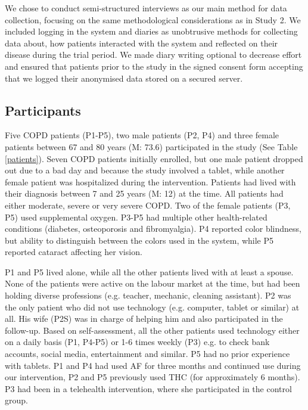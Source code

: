 We chose to conduct semi-structured interviews as our main method for data collection, focusing on the same methodological considerations as in Study 2. We included logging in the system and diaries as unobtrusive methods for collecting data about, how patients interacted with the system and reflected on their disease during the trial period. We made diary writing optional to decrease effort and ensured that patients prior to the study in the signed consent form accepting that we logged their anonymised data stored on a secured server. 

\subsection{Participants}
Five COPD patients (P1-P5), two male patients (P2, P4) and three female patients between 67 and 80 years (M: 73.6) participated in the study (See Table \ref{patients}). Seven COPD patients initially enrolled, but one male patient dropped out due to a bad day and because the study involved a tablet, while another female patient was hospitalized during the intervention. Patients had lived with their diagnosis between 7 and 25 years (M: 12) at the time. All patients had either moderate, severe or very severe COPD. Two of the female patients (P3, P5) used supplemental oxygen. P3-P5 had multiple other health-related conditions (diabetes, osteoporosis and fibromyalgia). P4 reported color blindness, but ability to distinguish between the colors used in the system, while P5 reported cataract affecting her vision. 

P1 and P5 lived alone, while all the other patients lived with at least a spouse. None of the patients were active on the labour market at the time, but had been holding diverse professions (e.g. teacher, mechanic, cleaning assistant). P2 was the only patient who did not use technology (e.g. computer, tablet or similar) at all. His wife (P2S) was in charge of helping him and also participated in the follow-up. Based on self-assessment, all the other patients used technology either on a daily basis (P1, P4-P5) or 1-6 times weekly (P3) e.g. to check bank accounts, social media, entertainment and similar. P5 had no prior experience with tablets. P1 and P4 had used AF for three months and continued use during our intervention, P2 and P5 previously used THC (for approximately 6 months). P3 had been in a telehealth intervention, where she participated in the control group.  

